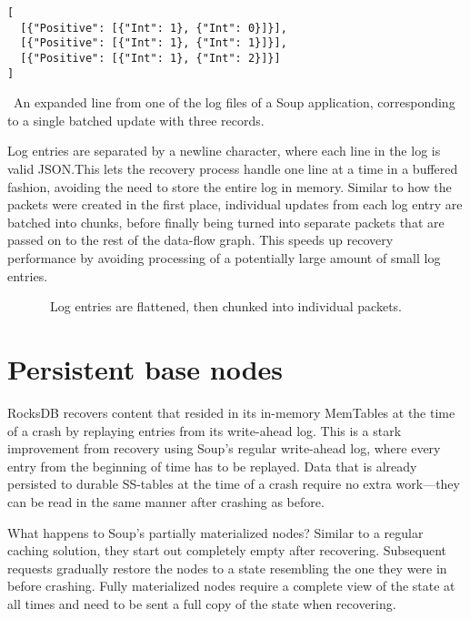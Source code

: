 \begin{listing}[H]
  \begin{verbatim}
[
  [{"Positive": [{"Int": 1}, {"Int": 0}]}],
  [{"Positive": [{"Int": 1}, {"Int": 1}]}],
  [{"Positive": [{"Int": 1}, {"Int": 2}]}]
]
  \end{verbatim}
  \caption{\
    An expanded line from one of the log files of a Soup application,
    corresponding to a single batched update with three records.
  }\label{lst:log-entry}
\end{listing}

Log entries are separated by a newline character, where each line in the log is
valid JSON.\@ This lets the recovery process handle one line at a time in a
buffered fashion, avoiding the need to store the entire log in memory. Similar
to how the packets were created in the first place, individual updates from each
log entry are batched into chunks, before finally being turned into separate
packets that are passed on to the rest of the data-flow graph. This speeds up
recovery performance by avoiding processing of a potentially large amount of
small log entries.

\begin{figure}[H]
  
  \caption{\
    Log entries are flattened, then chunked into individual packets.
  }\label{fig:log-chunking}
\end{figure}

\section{Persistent base nodes}

RocksDB recovers content that resided in its in-memory MemTables at the time of
a crash by replaying entries from its write-ahead log. This is a stark
improvement from recovery using Soup's regular write-ahead log, where every
entry from the beginning of time has to be replayed. Data that is already
persisted to durable SS-tables at the time of a crash require no extra
work---they can be read in the same manner after crashing as before.

What happens to Soup's partially materialized nodes? Similar to a regular
caching solution, they start out completely empty after recovering. Subsequent
requests gradually restore the nodes to a state resembling the one they were in
before crashing. Fully materialized nodes require a complete view of the state
at all times and need to be sent a full copy of the state when recovering.

